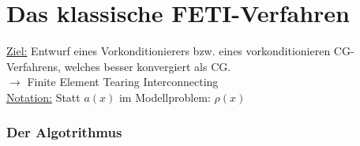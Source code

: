 \chapter {Das klassische FETI-Verfahren}

\underline{Ziel:} Entwurf eines Vorkonditionierers bzw. eines vorkonditionieren CG-Verfahrens, welches besser konvergiert als CG.\\
$\rightarrow$ Finite Element Tearing Interconnecting \\
\underline{Notation:} Statt $a(x)$ im Modellproblem: $\rho (x)$\\

\subsection{Der Algotrithmus}

